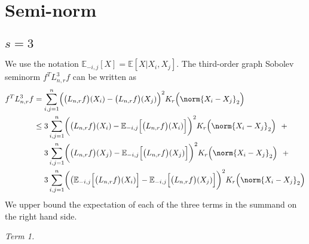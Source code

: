 \documentclass{article}
\newcommand{\1}{\mathbf{1}}
\newcommand{\Ebb}{\mathbb{E}}
\theoremstyle{alden}
\theoremstyle{aldenthm}
\theoremstyle{definition}
\theoremstyle{remark}
\begin{document}
\section{Semi-norm}

\subsection{$s = 3$}

We use the notation $\Ebb_{-i,j}[X] = \Ebb[X|X_i,X_j]$. The third-order graph Sobolev seminorm $f^T L_{n,r}^3 f$ can be written as
\begin{align*}
f^T L_{n,r}^3 f & = \sum_{i,j = 1}^{n} \Bigl(\bigl(L_{n,r}f\bigr)(X_i) - \bigl(L_{n,r}f\bigr)(X_j)\Bigr)^2 K_r\Bigl(\norm{X_i - X_j}_2\Bigr) \\
& \leq 3 \sum_{i,j = 1}^{n} \biggl(\bigl(L_{n,r}f\bigr)(X_i) - \Ebb_{-i,j}\Bigl[\bigl(L_{n,r}f\bigr)(X_i)\Bigr]\biggr)^2 K_r\Bigl(\norm{X_i - X_j}_2\Bigr) ~~ + \\
& ~~~~3 \sum_{i,j = 1}^{n} \biggl(\bigl(L_{n,r}f\bigr)(X_j) - \Ebb_{-i,j}\Bigl[\bigl(L_{n,r}f\bigr)(X_j)\Bigr]\biggr)^2 K_r\Bigl(\norm{X_i - X_j}_2\Bigr)~~ + \\
& ~~~~3 \sum_{i,j = 1}^{n} \biggl(\bigl(\Ebb_{-i,j}\Bigl[\bigl(L_{n,r}f\bigr)(X_i) \Bigr] - \Ebb_{-i,j}\Bigl[\bigl(L_{n,r}f\bigr)(X_j)\Bigr]\biggr)^2 K_r\Bigl(\norm{X_i - X_j}_2\Bigr)
\end{align*}
We upper bound the expectation of each of the three terms in the summand on the right hand side.

\textit{Term 1.}
\end{document}
